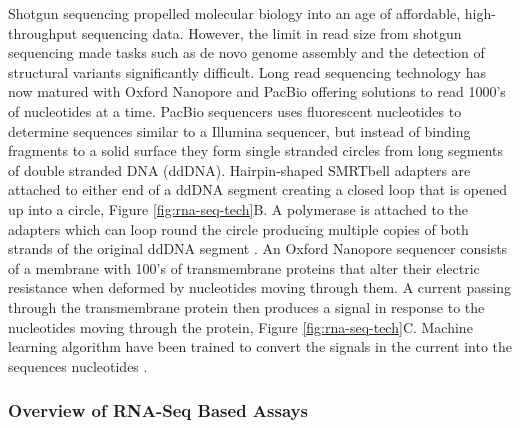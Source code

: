 \documentclass[../main.tex]{subfiles}
\begin{document}
Shotgun sequencing propelled molecular biology into an age of affordable, high-throughput sequencing data.
However, the limit in read size from shotgun sequencing made tasks such as de novo genome assembly and the detection of structural variants significantly difficult.
Long read sequencing technology has now matured with Oxford Nanopore and PacBio offering solutions to read 1000's of nucleotides at a time. 
PacBio sequencers uses fluorescent nucleotides to determine sequences similar to a Illumina sequencer, but instead of binding fragments to a solid surface they form single stranded circles from long segments of double stranded DNA (ddDNA).
Hairpin-shaped SMRTbell adapters are attached to either end of a ddDNA segment creating a closed loop that is opened up into a circle, Figure \ref{fig:rna-seq-tech}B. 
A polymerase is attached to the adapters which can loop round the circle producing multiple copies of both strands of the original ddDNA segment \parencite{Hu2021}.
An Oxford Nanopore sequencer consists of a membrane with 100's of transmembrane proteins that alter their electric resistance when deformed by nucleotides moving through them.  
A current passing through the transmembrane protein then produces a signal in response to the nucleotides moving through the protein, Figure \ref{fig:rna-seq-tech}C.
Machine learning algorithm have been trained to convert the signals in the current into the sequences nucleotides \parencite{Jain2016}.

\subsubsection{Overview of RNA-Seq Based Assays}
\end{document}
